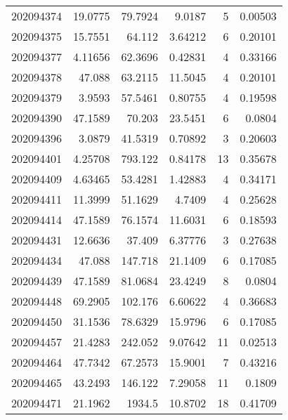 \begin{tabular}{rrrrrr}
 202094374 &         19.0775  &       79.7924 &            9.0187  &           5 & 0.00503 \\
 202094375 &         15.7551  &       64.112  &            3.64212 &           6 & 0.20101 \\
 202094377 &          4.11656 &       62.3696 &            0.42831 &           4 & 0.33166 \\
 202094378 &         47.088   &       63.2115 &           11.5045  &           4 & 0.20101 \\
 202094379 &          3.9593  &       57.5461 &            0.80755 &           4 & 0.19598 \\
 202094390 &         47.1589  &       70.203  &           23.5451  &           6 & 0.0804  \\
 202094396 &          3.0879  &       41.5319 &            0.70892 &           3 & 0.20603 \\
 202094401 &          4.25708 &      793.122  &            0.84178 &          13 & 0.35678 \\
 202094409 &          4.63465 &       53.4281 &            1.42883 &           4 & 0.34171 \\
 202094411 &         11.3999  &       51.1629 &            4.7409  &           4 & 0.25628 \\
 202094414 &         47.1589  &       76.1574 &           11.6031  &           6 & 0.18593 \\
 202094431 &         12.6636  &       37.409  &            6.37776 &           3 & 0.27638 \\
 202094434 &         47.088   &      147.718  &           21.1409  &           6 & 0.17085 \\
 202094439 &         47.1589  &       81.0684 &           23.4249  &           8 & 0.0804  \\
 202094448 &         69.2905  &      102.176  &            6.60622 &           4 & 0.36683 \\
 202094450 &         31.1536  &       78.6329 &           15.9796  &           6 & 0.17085 \\
 202094457 &         21.4283  &      242.052  &            9.07642 &          11 & 0.02513 \\
 202094464 &         47.7342  &       67.2573 &           15.9001  &           7 & 0.43216 \\
 202094465 &         43.2493  &      146.122  &            7.29058 &          11 & 0.1809  \\
 202094471 &         21.1962  &     1934.5    &           10.8702  &          18 & 0.41709 \\

\end{tabular}
